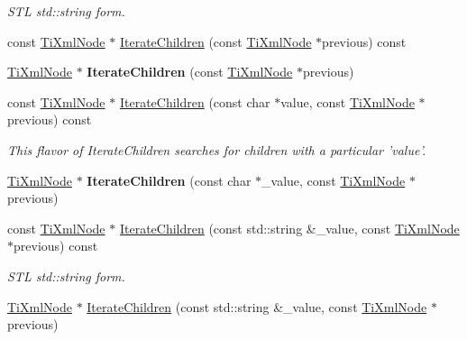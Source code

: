 \begin{DoxyCompactItemize}
\begin{DoxyCompactList}\small\item\em STL std::string form. \item\end{DoxyCompactList}\item 
const \hyperlink{class_ti_xml_node}{TiXmlNode} $\ast$ \hyperlink{class_ti_xml_node_a8621196ba3705fa226bef4a761cc51b6}{IterateChildren} (const \hyperlink{class_ti_xml_node}{TiXmlNode} $\ast$previous) const 
\item 
\hypertarget{class_ti_xml_node_a2358e747118fdbf0e467b1e4f7d03de1}{
\hyperlink{class_ti_xml_node}{TiXmlNode} $\ast$ {\bfseries IterateChildren} (const \hyperlink{class_ti_xml_node}{TiXmlNode} $\ast$previous)}
\label{class_ti_xml_node_a2358e747118fdbf0e467b1e4f7d03de1}

\item 
\hypertarget{class_ti_xml_node_adfaef35a076b9343adc1420757376c39}{
const \hyperlink{class_ti_xml_node}{TiXmlNode} $\ast$ \hyperlink{class_ti_xml_node_adfaef35a076b9343adc1420757376c39}{IterateChildren} (const char $\ast$value, const \hyperlink{class_ti_xml_node}{TiXmlNode} $\ast$previous) const }
\label{class_ti_xml_node_adfaef35a076b9343adc1420757376c39}

\begin{DoxyCompactList}\small\item\em This flavor of IterateChildren searches for children with a particular 'value'. \item\end{DoxyCompactList}\item 
\hypertarget{class_ti_xml_node_a67ba8275e533e6f76340236c42ea0aea}{
\hyperlink{class_ti_xml_node}{TiXmlNode} $\ast$ {\bfseries IterateChildren} (const char $\ast$\_\-value, const \hyperlink{class_ti_xml_node}{TiXmlNode} $\ast$previous)}
\label{class_ti_xml_node_a67ba8275e533e6f76340236c42ea0aea}

\item 
\hypertarget{class_ti_xml_node_a1cbaaf8e82c09ad763d52616d75724df}{
const \hyperlink{class_ti_xml_node}{TiXmlNode} $\ast$ \hyperlink{class_ti_xml_node_a1cbaaf8e82c09ad763d52616d75724df}{IterateChildren} (const std::string \&\_\-value, const \hyperlink{class_ti_xml_node}{TiXmlNode} $\ast$previous) const }
\label{class_ti_xml_node_a1cbaaf8e82c09ad763d52616d75724df}

\begin{DoxyCompactList}\small\item\em STL std::string form. \item\end{DoxyCompactList}\item 
\hypertarget{class_ti_xml_node_a16e9ad53e2f5445b14bf325c90aa862c}{
\hyperlink{class_ti_xml_node}{TiXmlNode} $\ast$ \hyperlink{class_ti_xml_node_a16e9ad53e2f5445b14bf325c90aa862c}{IterateChildren} (const std::string \&\_\-value, const \hyperlink{class_ti_xml_node}{TiXmlNode} $\ast$previous)}
\label{class_ti_xml_node_a16e9ad53e2f5445b14bf325c90aa862c}


\end{DoxyCompactItemize}
